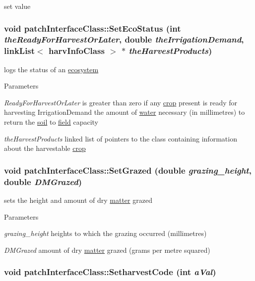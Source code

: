 set value \hypertarget{classpatch_interface_class_a277f24bc24c945c48b8bd0982c74bdcd}{
\subsubsection[{SetEcoStatus}]{\setlength{\rightskip}{0pt plus 5cm}void patchInterfaceClass::SetEcoStatus (int {\em theReadyForHarvestOrLater}, \/  double {\em theIrrigationDemand}, \/  {\bf linkList}$<$ {\bf harvInfoClass} $>$ $\ast$ {\em theHarvestProducts})}}
\label{classpatch_interface_class_a277f24bc24c945c48b8bd0982c74bdcd}


logs the status of an \hyperlink{classecosystem}{ecosystem} 
\begin{DoxyParams}{Parameters}
\item[{\em ReadyForHarvestOrLater}]is greater than zero if any \hyperlink{classcrop}{crop} present is ready for harvesting  IrrigationDemand the amount of \hyperlink{classwater}{water} necessary (in millimetres) to return the \hyperlink{classsoil}{soil} to \hyperlink{classfield}{field} capacity \item[{\em theHarvestProducts}]linked list of pointers to the class containing information about the harvestable \hyperlink{classcrop}{crop} \end{DoxyParams}
\hypertarget{classpatch_interface_class_a1bafa05b047f34929b265ff063237ef8}{
\subsubsection[{SetGrazed}]{\setlength{\rightskip}{0pt plus 5cm}void patchInterfaceClass::SetGrazed (double {\em grazing\_\-height}, \/  double {\em DMGrazed})}}
\label{classpatch_interface_class_a1bafa05b047f34929b265ff063237ef8}


sets the height and amount of dry \hyperlink{classmatter}{matter} grazed 
\begin{DoxyParams}{Parameters}
\item[{\em grazing\_\-height}]heights to which the grazing occurred (millimetres) \item[{\em DMGrazed}]amount of dry \hyperlink{classmatter}{matter} grazed (grams per metre squared) \end{DoxyParams}
\hypertarget{classpatch_interface_class_a789ced4ff646d1424b7771a51d86d69f}{
\subsubsection[{SetharvestCode}]{\setlength{\rightskip}{0pt plus 5cm}void patchInterfaceClass::SetharvestCode (int {\em aVal})}}
\label{classpatch_interface_class_a789ced4ff646d1424b7771a51d86d69f}


